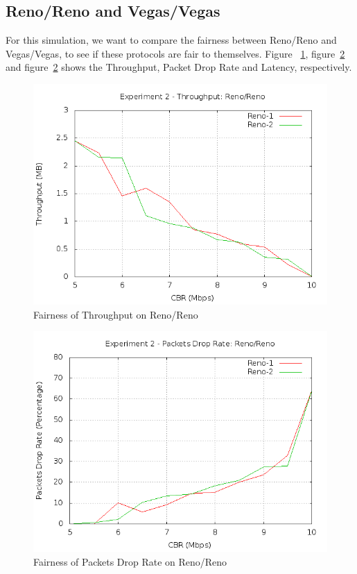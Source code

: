 \documentclass[10pt, conference]{lib/IEEEtran}
\begin{document}
\subsection{Reno/Reno and Vegas/Vegas}
For this simulation, we want to compare the fairness between Reno/Reno and Vegas/Vegas,
to see if these protocols are fair to themselves. Figure ~\ref{fig:exp2_thp_rr}, figure~\ref{fig:exp2_dr_rr} and figure~\ref{fig:exp2_dr_rr} shows the Throughput, Packet Drop Rate and Latency, respectively.
\begin{figure}[H]
    \centering
    \includegraphics[width=1.0\linewidth]{plot/exp2-thp-Reno-Reno.png}
    \caption{Fairness of Throughput on Reno/Reno}
    \label{fig:exp2_thp_rr}
\end{figure}
\begin{figure}[H]
    \centering
    \includegraphics[width=1.0\linewidth]{plot/exp2-dr-Reno-Reno.png}
    \caption{Fairness of Packets Drop Rate on Reno/Reno}
    \label{fig:exp2_dr_rr}
\end{figure}
\end{document}
